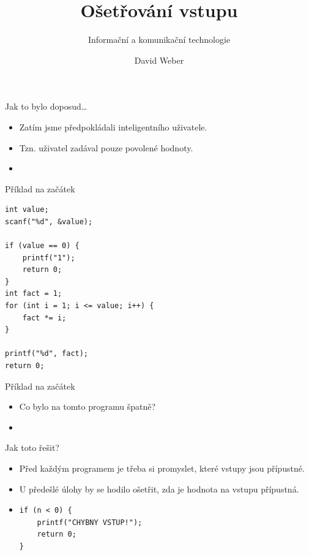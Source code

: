 \documentclass[14pt,aspectratio=169]{beamer}
\subtitle{Informační a komunikační technologie}
\title{Ošetřování vstupu}
\author{David Weber}
\begin{document}

    \begin{frame}
        \titlepage
    \end{frame}

    \begin{frame}[t,fragile]{Jak to bylo doposud\dots}
        \begin{itemize}
            \item Zatím jsme předpokládali inteligentního uživatele.
            \item Tzn. uživatel zadával pouze povolené hodnoty.
            \item {}
        \end{itemize}
    \end{frame}

    \begin{frame}[t,fragile]{Příklad na začátek}
        \begin{lstlisting}
int value;
scanf("%d", &value);

if (value == 0) {
    printf("1");
    return 0;
}
int fact = 1;
for (int i = 1; i <= value; i++) {
    fact *= i;
}

printf("%d", fact);
return 0;
        \end{lstlisting}
    \end{frame}

    \begin{frame}[t]{Příklad na začátek}
        \begin{itemize}
            \item Co bylo na tomto programu špatně?
            \item {}
        \end{itemize}
    \end{frame}

    \begin{frame}[t,fragile]{Jak toto řešit?}
        \begin{itemize}
            \item Před každým programem je třeba si promyslet, které vstupy jsou přípustné.
            \item U předešlé úlohy by se hodilo ošetřit, zda je hodnota na vstupu přípustná.
            \item {}
            \begin{lstlisting}
if (n < 0) {
    printf("CHYBNY VSTUP!");
    return 0;
}
            \end{lstlisting}
        \end{itemize}
    \end{frame}
\end{document}
